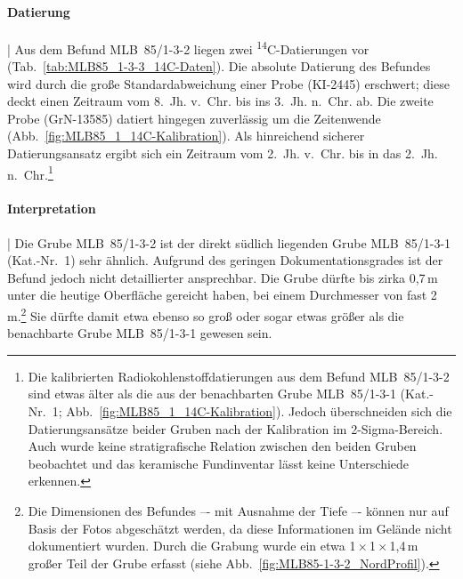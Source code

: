 \paragraph{Datierung}\hspace{-.5em}|\hspace{.5em}%
Aus dem Befund MLB~85/1-3-2 liegen zwei \textsuperscript{14}C-Datierungen vor (Tab.~\ref{tab:MLB85_1-3-3_14C-Daten}). Die absolute Datierung des Befundes wird durch die große Standardabweichung einer Probe (KI-2445) erschwert; diese deckt einen Zeitraum vom 8.~Jh. v.~Chr. bis ins 3.~Jh. n.~Chr. ab. Die zweite Probe (GrN-13585) datiert hingegen zuverlässig um die Zeitenwende (Abb.~\ref{fig:MLB85_1_14C-Kalibration}). Als hinreichend sicherer Datierungsansatz ergibt sich ein Zeitraum vom 2.~Jh. v.~Chr. bis in das 2.~Jh. n.~Chr.\footnote{Die kalibrierten Radiokohlenstoffdatierungen aus dem Befund MLB~85/1-3-2 sind etwas älter als die aus der benachbarten Grube MLB~85/1-3-1 (Kat.-Nr.~1; Abb.~\ref{fig:MLB85_1_14C-Kalibration}). Jedoch überschneiden sich die Datierungsansätze beider Gruben nach der Kalibration im 2-Sigma-Bereich. Auch wurde keine stratigrafische Relation zwischen den beiden Gruben beobachtet und das keramische Fundinventar lässt keine Unterschiede erkennen.}

\paragraph{Interpretation}\hspace{-.5em}|\hspace{.5em}%
Die Grube MLB~85/1-3-2 ist der direkt südlich liegenden Grube MLB~85/1-3-1 (Kat.-Nr.~1) sehr ähnlich. Aufgrund des geringen Dokumentationsgrades ist der Befund jedoch nicht detaillierter ansprechbar. Die Grube dürfte bis zirka 0,7\,m unter die heutige Oberfläche gereicht haben, bei einem Durchmesser von fast 2\,m.\footnote{Die Dimensionen des Befundes –- mit Ausnahme der Tiefe –- können nur auf Basis der Fotos abgeschätzt werden, da diese Informationen im Gelände nicht dokumentiert wurden. Durch die Grabung wurde ein etwa 1\,$\times$\,1\,$\times$\,1,4\,m großer Teil der Grube erfasst (siehe Abb.~\ref{fig:MLB85-1-3-2_NordProfil}).} Sie dürfte damit etwa ebenso so groß oder sogar etwas größer als die benachbarte Grube MLB~85/1-3-1 gewesen sein.